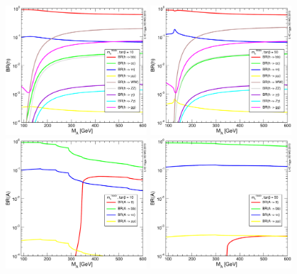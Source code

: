 \begin{figure}[tp]
     \begin{center}

            \includegraphics[width=0.47\textwidth]{figure/BR_higgs/YRHXS3_BR_fig35.pdf}
            \includegraphics[width=0.47\textwidth]{figure/BR_higgs/YRHXS3_BR_fig36.pdf}
            \includegraphics[width=0.47\textwidth]{figure/BR_higgs/YRHXS3_BR_fig31.pdf}
            \includegraphics[width=0.47\textwidth]{figure/BR_higgs/YRHXS3_BR_fig32.pdf}

\end{center}
\end{figure}

